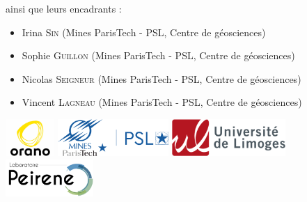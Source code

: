 \documentclass{article}
\begin{document}
ainsi que leurs encadrants :

\begin{itemize}
    \item Irina \textsc{Sin} (Mines ParisTech - PSL, Centre de géosciences) 
    \item Sophie \textsc{Guillon} (Mines ParisTech - PSL, Centre de géosciences) 
    \item Nicolas \textsc{Seigneur} (Mines ParisTech - PSL, Centre de géosciences) 
    \item Vincent \textsc{Lagneau} (Mines ParisTech - PSL, Centre de géosciences) 
\end{itemize}


\vspace{1 em}
\begin{center}
\includegraphics[height = 40pt]{oranologo.png}
\hspace{0.3em}
\includegraphics[height = 40pt ]{logoMPT.png}
\hspace{0.3em}
\includegraphics[height = 40pt ]{logoUNILIM.png}
\hspace{0.3em}
\includegraphics[height = 40pt ]{Logo-PEIRENE.png}


\end{center}
\end{document}
